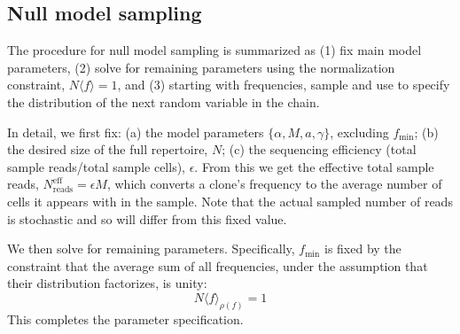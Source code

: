 \subsection*{Null model sampling}\label{sec:null_sampling}
The procedure for null model sampling is summarized as (1) fix main model parameters, (2) solve for remaining parameters using the normalization constraint, $N \langle f \rangle=1$, and (3) starting with frequencies, sample and use to specify the distribution of the next random variable in the chain.

In detail, we first fix: (a)
the model parameters $\{\alpha,M,a,\gamma\}$, excluding $f_{\textrm{min}}$;
(b) the desired size of the full repertoire, $N$;
(c) the sequencing efficiency (total sample reads/total sample cells), $\epsilon$. From this we get the effective total sample reads, $N^{\textrm{eff}}_{\textrm{reads}}=\epsilon M$, which converts a clone's frequency to the average number of cells it appears with in the sample.
Note that the actual sampled number of reads is stochastic and so will differ from this fixed value.

We then solve for remaining parameters. Specifically, $f_{\textrm{min}}$ is fixed by the constraint that the average sum of all frequencies, under the assumption that their distribution factorizes, is unity:
\begin{equation}
	N \langle f\rangle_{\rho(f)}=1
\end{equation}
This completes the parameter specification.

